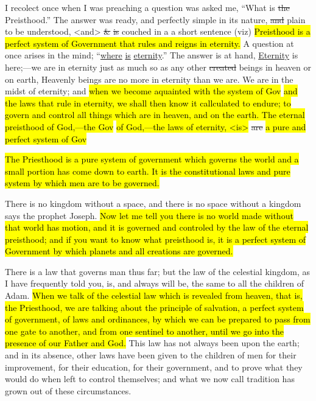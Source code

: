 		\begin{compactdesc}
			\item[{\hyperref[EMS-1854-BY-12-FEB-1854]{12 February 1854}}] I recolect once when I was preaching a question was asked me, ``What is \sout{the} Preisthood.'' The answer was ready, and perfectly simple in its nature, \sout{and} plain to be understood, <and> \sout{\&} \sout{is} couched in a a short sentence (viz) \hl{Preisthood is a perfect system of Government that rules and reigns in eternity.} A question at once arises in the mind; ``\uline{where} \uline{is} \uline{eternity}.'' The answer is at hand, \uline{Eternity} is here;---we are in eternity just as much so as any other \sout{created} beings in heaven or on earth, Heavenly beings are no more in eternity than we are. We are in the midst of eternity; and \hl{when we become aquainted with the system of Gov}\hl{ and the laws that rule in eternity, we shall then know it callculated to endure; to govern and control all things which are in heaven, and on the earth. The eternal preisthood of God,---the Gov}\hl{ of God,---the laws of eternity, <is> }\sout{are} \hl{a pure and perfect system of Gov}
			\item[{\hyperref[EMS-1854-BY-27-JUN-1854]{27 June 1854}}] \hl{The Priesthood is a pure system of government which governs the world and a small portion has come down to earth. It is the constitutional laws and pure system by which men are to be governed.}
			\item[{\hyperref[EMS-1854-BY-19-NOV-1854]{19 November 1854}}] There is no kingdom without a space, and there is no space without a kingdom says the prophet Joseph. \hl{Now let me tell you there is no world made without that world has motion, and it is governed and controled by the law of the eternal preisthood; and if you want to know what preisthood is, it is a perfect system of Government by which planets and all creations are governed.}
			\item[{\hyperref[EMS-1854-BY-3-DEC-1854]{3 December 1854}}] There is a law that governs man thus far; but the law of the celestial kingdom, as I have frequently told you, is, and always will be, the same to all the children of Adam. \hl{When we talk of the celestial law which is revealed from heaven, that is, the Priesthood, we are talking about the principle of salvation, a perfect system of government, of laws and ordinances, by which we can be prepared to pass from one gate to another, and from one sentinel to another, until we go into the presence of our Father and God.} This law has not always been upon the earth; and in its absence, other laws have been given to the children of men for their improvement, for their education, for their government, and to prove what they would do when left to control themselves; and what we now call tradition has grown out of these circumstances.

\end{compactdesc}
